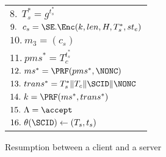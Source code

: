 \begin{figure*}[!htp]
\begin{center}
{\begin{minipage}[t]{0.35\textwidth}
\begin{tabular}[t]{l}
 $8.\ \ T_s^{\ast} = g^{t_s^{\ast}} $ \\
 $9.\ \ c_s = \SE.\Enc(k, len, H, T_s^{\ast}, st_e)$ \\
 $10.\  m_3 = (c_s)$ \\
 $11.\  pms^{\ast} = T_c^{t_s^{\ast}}$ \\
 $12.\  ms^{\ast} = \PRF(pms^{\ast}, \NONC)$ \\
 $13.\  trans^{\ast} = T_s^{\ast} \| T_c \| \SCID \| \NONC$ \\
 $14.\  k=\PRF(ms^{\ast}, trans^{\ast})$ \\
 $15.\  \Lambda=\accept$ \\
 $16.\  \theta(\SCID) \leftarrow (T_s, t_s)$ \\
\end{tabular}
\end{minipage}%
} \vspace{10pt}

Resumption between a client and a server \vspace{10pt}\\


\end{center}
\end{figure*}
